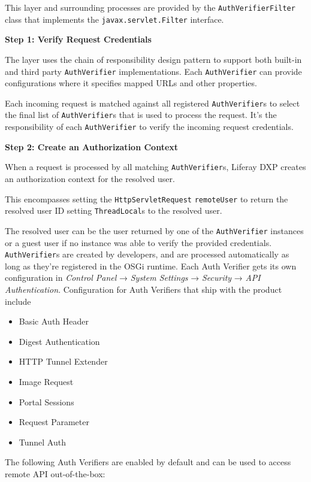 This layer and surrounding processes are provided by the
\texttt{AuthVerifierFilter} class that implements the
\texttt{javax.servlet.Filter} interface.

\textbf{Step 1: Verify Request Credentials}

The layer uses the chain of responsibility design pattern to support
both built-in and third party \texttt{AuthVerifier} implementations.
Each \texttt{AuthVerifier} can provide configurations where it specifies
mapped URLs and other properties.

Each incoming request is matched against all registered
\texttt{AuthVerifier}s to select the final list of
\texttt{AuthVerifier}s that is used to process the request. It's the
responsibility of each \texttt{AuthVerifier} to verify the incoming
request credentials.

\textbf{Step 2: Create an Authorization Context}

When a request is processed by all matching \texttt{AuthVerifier}s,
Liferay DXP creates an authorization context for the resolved user.

This encompasses setting the \texttt{HttpServletRequest}
\texttt{remoteUser} to return the resolved user ID setting
\texttt{ThreadLocal}s to the resolved user.

The resolved user can be the user returned by one of the
\texttt{AuthVerifier} instances or a guest user if no instance was able
to verify the provided credentials. \texttt{AuthVerifier}s are created
by developers, and are processed automatically as long as they're
registered in the OSGi runtime. Each Auth Verifier gets its own
configuration in \emph{Control Panel} → \emph{System Settings} →
\emph{Security} → \emph{API Authentication}. Configuration for Auth
Verifiers that ship with the product include

\begin{itemize}
\tightlist
\item
  Basic Auth Header
\item
  Digest Authentication
\item
  HTTP Tunnel Extender
\item
  Image Request
\item
  Portal Sessions
\item
  Request Parameter
\item
  Tunnel Auth
\end{itemize}

The following Auth Verifiers are enabled by default and can be used to
access remote API out-of-the-box:

